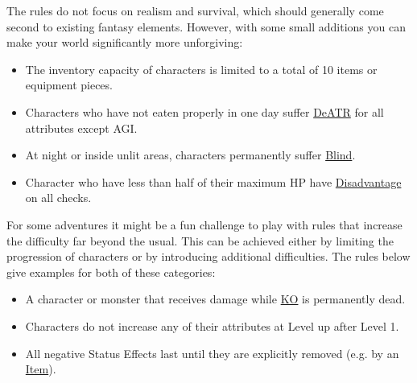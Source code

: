 \begin{description}[leftmargin=*]

\item[\color{accent} Survival:]
The rules do not focus on realism and survival, which should generally come second to existing fantasy elements.
However, with some small additions you can make your world significantly more unforgiving: 
\begin{itemize}[leftmargin=*]  
	\item The inventory capacity of characters is limited to a total of 10 items or equipment pieces.
	\item Characters who have not eaten properly in one day suffer \hyperlink{status}{DeATR} for all attributes except AGI.
	\item At night or inside unlit areas, characters permanently suffer \hyperlink{status}{Blind}. 
	\item Character who have less than half of their maximum HP have \hyperlink{check}{Disadvantage} on all checks.
\end{itemize}

\vfill

\item[\color{accent} Challenges:]
For some adventures it might be a fun challenge to play with rules that increase the 
difficulty far beyond the usual.
This can be achieved either by limiting the progression of characters or by introducing additional difficulties. 
The rules below give examples for both of these categories:
\begin{itemize}[leftmargin=*]   
	\item A character or monster that receives damage while \hyperlink{status}{KO} is permanently dead.
	\item Characters do not increase any of their attributes at Level up after Level 1.
	\item All negative Status Effects last until they are explicitly removed (e.g. by an \hyperlink{item}{Item}).
\end{itemize}

\pagebreak


\end{description}
